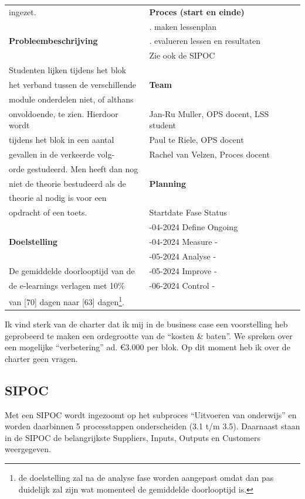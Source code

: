 \documentclass[
  a4paper,
  DIV=11,
  numbers=noendperiod]{scrartcl}
\begin{document}
\begin{longtable}[]{@{}
  >{\raggedright\arraybackslash}p{}
  >{\raggedright\arraybackslash}p{}@{}}
ingezet. & \textbf{Proces (start en einde)} \\
& 1. maken lessenplan \\
\textbf{Probleembeschrijving} & 5. evalueren lessen en resultaten \\
& Zie ook de SIPOC \\
Studenten lijken tijdens het blok & \\
het verband tussen de verschillende & \textbf{Team} \\
module onderdelen niet, of althans & \\
onvoldoende, te zien. Hierdoor wordt & Jan-Ru Muller, OPS docent, LSS
student \\
tijdens het blok in een aantal & Paul te Riele, OPS docent \\
gevallen in de verkeerde volg- & Rachel van Velzen, Proces docent \\
orde gestudeerd. Men heeft dan nog & \\
niet de theorie bestudeerd als de & \textbf{Planning} \\
theorie al nodig is voor een & \\
opdracht of een toets. & Startdate Fase Status \\
& 15-04-2024 Define Ongoing \\
\textbf{Doelstelling} & 30-04-2024 Measure - \\
& 15-05-2024 Analyse - \\
De gemiddelde doorlooptijd van de & 30-05-2024 Improve - \\
de e-learnings verlagen met 10\% & 15-06-2024 Control - \\
van {[}70{]} dagen naar {[}63{]} dagen\footnote{de doelstelling zal na
  de analyse fase worden aangepast omdat dan pas duidelijk zal zijn wat
  momenteel de gemiddelde doorlooptijd is.}. & \\
\end{longtable}

Ik vind sterk van de charter dat ik mij in de business case een
voorstelling heb geprobeerd te maken een ordegrootte van de ``kosten \&
baten''. We spreken over een mogelijke ``verbetering'' ad. €3.000 per
blok. Op dit moment heb ik over de charter geen vragen.

\newpage

\subsection{SIPOC}\label{sipoc}

Met een SIPOC wordt ingezoomt op het subproces ``Uitvoeren van
onderwijs'' en worden daarbinnen 5 processtappen onderscheiden (3.1 t/m
3.5). Daarnaast staan in de SIPOC de belangrijkste Suppliers, Inputs,
Outputs en Customers weergegeven.
\end{document}
